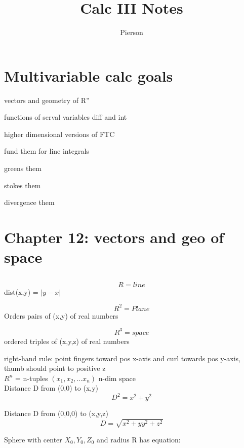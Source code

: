 \documentclass{article}
\author{Pierson}
\begin{document}
\title{Calc III Notes}

\maketitle

\section{Multivariable calc goals}
\begin{list}{-}{}
    \item vectors and geometry of R''
    \item functions of serval variables diff and int
    \item higher dimensional versions of FTC
    \item fund them for line integrals
    \item greens them
    \item stokes them
    \item divergence them
\end{list}

\setcounter{section}{11}
\section{Chapter 12: vectors and geo of space}
\subsection{}
    \begin{list}{-}{}
    \item \[R = line\] dist(x,y) = $ |y - x | $
    \item \[R^2 = Plane\] Orders pairs of (x,y) of real numbers
    \item \[R^3 = space\] ordered triples of (x,y,z) of real numbers
    \end{list}

right-hand rule: point fingers toward pos x-axis and curl towards pos y-axis, thumb should point to positive z\\


$R^n$ = n-tuples $(x_1, x_2, ... x_n)$ n-dim space\\

Distance D from (0,0) to (x,y)
\[D^2 = x^2 +y^2\]

Distance D from (0,0,0) to (x,y,z)
\[ D = \sqrt{x^2+yy^2+z^2}\] 

Sphere with center $X_0, Y_0, Z_0$ and radius R has equation:
\end{document}
